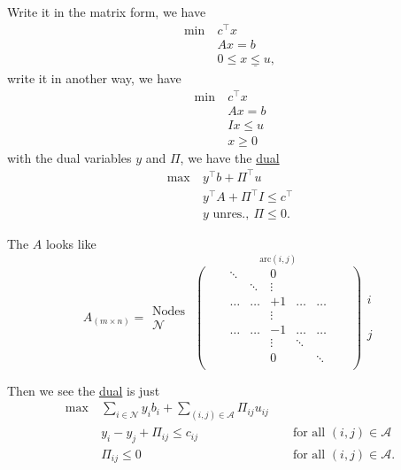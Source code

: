 \begin{answer}
	Write it in the matrix form, we have
	\[
		\begin{aligned}
			\min~ & c^{\top}x                  \\
			      & Ax = b                     \\
			      & 0\leq \underline{x\leq u},
		\end{aligned}
	\]
	write it in another way, we have
	\[
		\begin{aligned}
			\min~ & c^{\top}x \\
			      & Ax = b    \\
			      & Ix\leq u  \\
			      & x\geq 0
		\end{aligned}
	\]
	with the dual variables \(y\) and \(\Pi\), we have the \hyperref[def:dual]{dual}
	\[
		\begin{aligned}
			\max~ & y^{\top}b + \Pi^{\top}u            \\
			      & y^{\top}A+\Pi^{\top}I\leq c^{\top} \\
			      & y\text{ unres.},\ \Pi\leq 0.
		\end{aligned}
	\]

	The \(A\) looks like
	\[
		A_{(m\times n)} = \substack{\text{Nodes }\\\mathcal{N}}\overset{\mathrm{arc}(i, j)}{
			\begin{pmatrix}
				 &  & \ddots &        & 0      &        &        &  & \\
				 &  &        & \ddots & \vdots &        &        &  & \\
				 &  & \ldots & \ldots & +1     & \ldots & \ldots &  & \\
				 &  &        &        & \vdots &        &        &  & \\
				 &  & \ldots & \ldots & -1     & \ldots & \ldots &  & \\
				 &  &        &        & \vdots & \ddots &        &  & \\
				 &  &        &        & 0      &        & \ddots &  & \\
			\end{pmatrix}}\substack{i\\ \\ \\ \\ \\ j}
	\]

	Then we see the \hyperref[def:dual]{dual} is just
	\[
		\begin{alignedat}{3}
			\max~ & \sum\limits_{i\in\mathcal{N}}y_{i}b_{i}+\sum\limits_{(i, j)\in\mathcal{A}} \Pi_{ij}u_{ij}                                        \\
			& y_{i} - y_{j}+\Pi_{ij}\leq c_{ij}                                                         && \text{ for all }(i, j)\in\mathcal{A} \\
			& \Pi_{ij}\leq 0                                                                            && \text{ for all }(i, j)\in\mathcal{A}.
		\end{alignedat}
	\]
\end{answer}